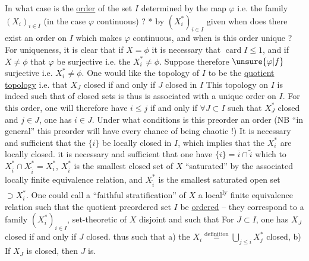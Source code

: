 In what case is the \uline{order} of the set $I$ determined
by the map $\varphi$ i.e. the family $(X_i)_{i\in I}$ (in the
case $\varphi$ continuous) ? *    by $(X_i^*)_{i\in I}$ given
when  does there exist an order on $I$ which makes $\varphi$
continuous, and when is this order unique ?
For uniqueness, it is clear that if $X=\phi$ it
is necessary that $\operatorname{card}I\leq1$, and if $X\ne\phi$ that $\varphi$ be
surjective i.e. the $X_i^*\ne\phi$. Suppose therefore $\unsure{\varphi|f}$ surjective i.e.
$X_i^*\ne\phi$. One would like the topology of $I$ to be the \uline{quotient}
\uline{topology} i.e. that $X_J$ closed if and only if $J$ closed in $I$
This topology on $I$ is indeed such that 
of closed sets is   thus is associated with a unique
order on $I$. For this order, one will therefore have
$i\leq j$ if and only if  $\forall J\subset I$ such that $X_J^*$ closed and $j\in J$, one
has $i\in J$. Under what conditions is this preorder
an order (NB ``in general'' this preorder will have every
chance of being chaotic !) It is necessary and sufficient that
the $\{i\}$ be locally closed in $I$, which
implies that the $X_i^*$ are locally closed.  
  it is necessary and sufficient that  one have 
$\{i\}=\overline i\cap\widetilde i$ which  to 
$X_{\overline i}^*\cap X_{\widetilde i}^*=X_i^*$,
 $X_{\overline i}^*$ is the smallest closed set of $X$  ``saturated'' by the
associated locally finite equivalence relation, and $X_{\widetilde i}^*$ is the
smallest saturated open set $\supset X_i^*$. One could call
a ``faithful stratification'' of $X$ a local\textsuperscript{ly} finite equivalence
relation such that the quotient preordered set
$I$ be \uline{ordered} -- they correspond to a family
$(X_i^*)_{i\in I}$, set-theoretic  of $X$ 
 
disjoint and such that
For $J\subset I$, one has $X_J$ closed if and only if $J$ closed.
thus such that a) the $X_i\overset{\mathrm{definition}}=\bigcup_{j\leq i}X_j^*$ closed,
b) If $X_J$ is closed, then $J$ is.
